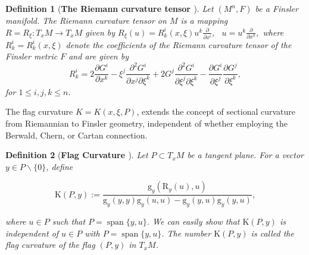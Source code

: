 \documentclass[pdflatex,sn-mathphys-num]{sn-jnl}%
\theoremstyle{thmstyleone}%
\theoremstyle{thmstyletwo}%
\theoremstyle{thmstylethree}%
\newtheorem{definition}{Definition}%
\begin{document}
\vspace{0.15in}	

\begin{definition}[\textbf{The Riemann curvature tensor \cite[\boldmath p. $50$]{CXSZ}}] \label{def2}  
 	Let $(M^n,F)$ be a Finsler manifold. The Riemann curvature tensor on $M$ is a mapping $R={{R}_\xi:T_xM \rightarrow T_xM}$ given by
 ${R}_{\xi}(u)={R}^{i}_{k}(x,\xi)u^{k} \frac{\partial}{\partial x^i}$,
 	\ $u=u^k\frac{\partial}{\partial x^k}$,\ where ${R}^{i}_{k}={R}^{i}_{k}(x,\xi)$ denote the coefficients of the Riemann curvature tensor of the Finsler metric $F$ and are given by
 	\begin{equation}\label{eqn2.2.10}
 			{R}^{i}_{k}=2\frac{\partial{G}^i}{\partial	x^k}-\xi^j\frac{\partial^2{G}^i}{\partial x^j\partial	\xi^k}+2{G}^j\frac{\partial^2 {G}^i}{\partial \xi^j\partial	\xi^k}-\frac{\partial{G}^i}{\partial \xi^j}\frac{\partial {G}^j}{\partial \xi^k},
 	\end{equation}
  for $1\leq i,j,k\leq n.$
 	\end{definition}



\vspace{0.15in}	

  
 \noindent	The flag curvature $K=K(x,\xi,P)$, extends the concept of sectional curvature from Riemannian to Finsler geometry, independent of whether employing the Berwald, Chern, or Cartan connection.





\vspace{0.15in}	



\begin{definition}[\textbf{Flag Curvature \cite[\boldmath p. $98$]{SSZ}}]

    Let $P \subset T_{x} M$ be a tangent plane. For a vector $y \in P \backslash\{0\}$, define

$$
\mbox{K}(P, y):=\frac{\mbox{g}_{y}\left(\mbox{R}_{y}(u), u\right)}{\mbox{g}_{y}(y, y) \mbox{g}_{y}(u, u)-\mbox{g}_{y}(y, u) \mbox{g}_{y}(y, u)},
$$

where $u \in P$ such that $P=\operatorname{span}\{y, u\}$. We can easily show that $\mbox{K}(P, y)$ is independent of $u \in P$ with $P=\operatorname{span}\{y, u\}$. The number $\mbox{K}(P, y)$ is called the flag curvature of the flag $(P, y)$ in $T_{x} M$.
\end{definition}

\end{document}
